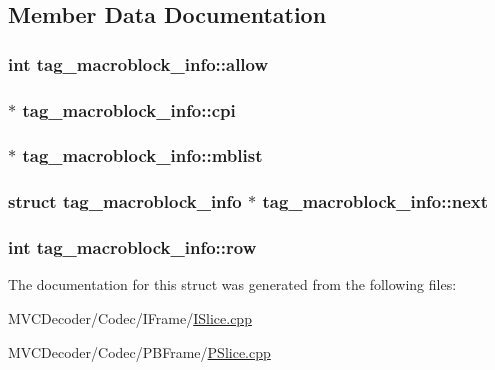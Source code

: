 \subsection{Member Data Documentation}
\hypertarget{structtag__macroblock__info_affbe6dcc30999a24be78a7deb7a0e78b}{
\subsubsection[{allow}]{\setlength{\rightskip}{0pt plus 5cm}int {\bf tag\_\-macroblock\_\-info::allow}}}
\label{structtag__macroblock__info_affbe6dcc30999a24be78a7deb7a0e78b}
\hypertarget{structtag__macroblock__info_ae7a0c6b68c7cbc0ffb1a82799eb386ef}{
\subsubsection[{cpi}]{ $\ast$ {\bf tag\_\-macroblock\_\-info::cpi}}}
\label{structtag__macroblock__info_ae7a0c6b68c7cbc0ffb1a82799eb386ef}
\hypertarget{structtag__macroblock__info_a150f68ca8a911ab2443199821f7b97e5}{
\subsubsection[{mblist}]{ $\ast$ {\bf tag\_\-macroblock\_\-info::mblist}}}
\label{structtag__macroblock__info_a150f68ca8a911ab2443199821f7b97e5}
\hypertarget{structtag__macroblock__info_ae6d03b766139a5abf281211e48c8d49b}{
\subsubsection[{next}]{\setlength{\rightskip}{0pt plus 5cm}struct {\bf tag\_\-macroblock\_\-info} $\ast$ {\bf tag\_\-macroblock\_\-info::next}}}
\label{structtag__macroblock__info_ae6d03b766139a5abf281211e48c8d49b}
\hypertarget{structtag__macroblock__info_a0431b0abc33b349505f0b83fd1537473}{
\subsubsection[{row}]{\setlength{\rightskip}{0pt plus 5cm}int {\bf tag\_\-macroblock\_\-info::row}}}
\label{structtag__macroblock__info_a0431b0abc33b349505f0b83fd1537473}


The documentation for this struct was generated from the following files:\begin{DoxyCompactItemize}
\item 
MVCDecoder/Codec/IFrame/\hyperlink{_i_slice_8cpp}{ISlice.cpp}\item 
MVCDecoder/Codec/PBFrame/\hyperlink{_p_slice_8cpp}{PSlice.cpp}\end{DoxyCompactItemize}
